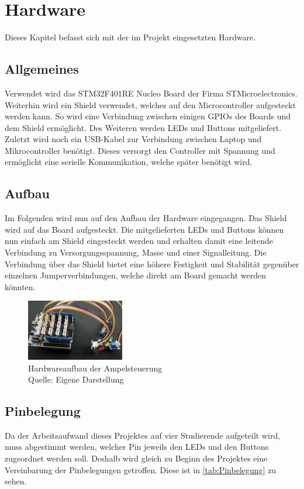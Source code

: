 
\chapter{Hardware}
Dieses Kapitel befasst sich mit der im Projekt eingesetzten Hardware.

\section{Allgemeines}
Verwendet wird das STM32F401RE Nucleo Board der Firma STMicroelectronics. Weiterhin wird ein Shield verwendet, welches auf den Microcontroller aufgesteckt werden kann. So wird eine Verbindung zwischen einigen GPIOs des Boards und dem Shield ermöglicht. Des Weiteren werden LEDs und Buttons mitgeliefert. Zuletzt wird noch ein USB-Kabel zur Verbindung zwischen Laptop und Mikrocontroller benötigt. Dieses versorgt den Controller mit Spannung und ermöglicht eine serielle Kommunikation, welche später benötigt wird.

\section{Aufbau}
Im Folgenden wird nun auf den Aufbau der Hardware eingegangen. Das Shield wird auf das Board aufgesteckt. Die mitgelieferten LEDs und Buttons können nun einfach am Shield eingesteckt werden und erhalten damit eine leitende Verbindung zu Versorgungsspannung, Masse und einer Signalleitung. Die Verbindung über das Shield bietet eine höhere Festigkeit und Stabilität gegenüber einzelnen Jumperverbindungen, welche direkt am Board gemacht werden könnten. \\

\begin{figure}[H] 
	\centering
	\includegraphics[width=0.38\textwidth]{images/02.png}
	\caption{Hardwareaufbau der Ampelsteuerung  \protect \\ Quelle: Eigene Darstellung }
	\label{fig:grafik2}
\end{figure}


\section{Pinbelegung}
Da der Arbeitsaufwand dieses Projektes auf vier Studierende aufgeteilt wird, muss abgestimmt werden, welcher Pin jeweils den LEDs und den Buttons zugeordnet werden soll. Deshalb wird gleich zu Beginn des Projektes eine Vereinbarung der Pinbelegungen getroffen. Diese ist in \autoref{tab:Pinbelegung} zu sehen.\\

